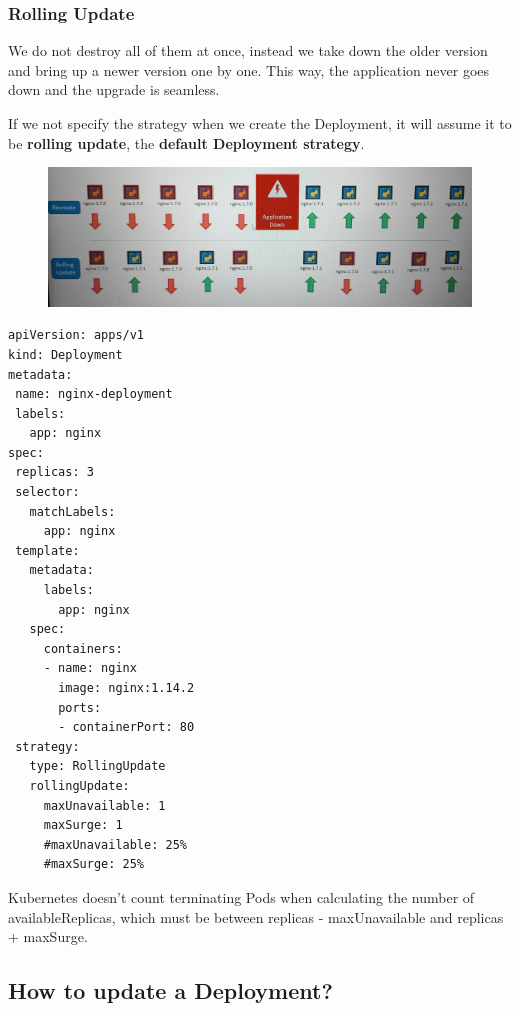 \documentclass{article}
\newenvironment{blocktemplate}[1]{%
    \tcolorbox[beamer,%
    noparskip,breakable,
    colframe=Blue,%
    colbacklower=LimeGreen!75!LightGreen,%
    title=#1]}%
    {\endtcolorbox}
\newenvironment{blocktemplateI}[1]{%
    \tcolorbox[beamer,%
    noparskip,breakable,
    colframe=Violet,%
    colbacklower=Black,%
    title=#1]}%
    {\endtcolorbox}
\newenvironment{codetemplate}[1][]{%
  \mybasecolorbox[#1]
  \itshape
}{%
  \endmybasecolorbox
}
\begin{document}
\subsubsection{Rolling Update}
We do not destroy all of them at once, instead we take down the older version and bring up a newer version one by one. This way, the application never goes down and the upgrade is seamless.

\begin{blocktemplate}{NOTE}
If we not specify the strategy when we create the Deployment, it will assume it to be \textbf{rolling update}, the \textbf{default Deployment strategy}.
\end{blocktemplate}

\begin{figure}[H]
    \centering
    \includegraphics[width=\textwidth]{pictures/depest.png}
\end{figure}

\begin{codetemplate}{}
\begin{verbatim}
apiVersion: apps/v1
kind: Deployment
metadata:
 name: nginx-deployment
 labels:
   app: nginx
spec:
 replicas: 3
 selector:
   matchLabels:
     app: nginx
 template:
   metadata:
     labels:
       app: nginx
   spec:
     containers:
     - name: nginx
       image: nginx:1.14.2
       ports:
       - containerPort: 80
 strategy:
   type: RollingUpdate
   rollingUpdate:
     maxUnavailable: 1
     maxSurge: 1
     #maxUnavailable: 25%
     #maxSurge: 25%
\end{verbatim}
\end{codetemplate}

\begin{blocktemplateI}{NOTE}
Kubernetes doesn't count terminating Pods when calculating the number of availableReplicas, which must be between replicas - maxUnavailable and replicas + maxSurge.
\end{blocktemplateI}

\subsection{How to update a Deployment?}
\end{document}
